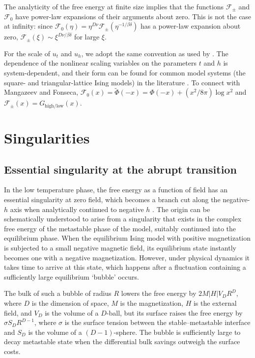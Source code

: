 \documentclass[
  aps,
  pre,
  preprint,
  longbibliography,
  floatfix
]{revtex4-2}
\begin{document}
The analyticity of the free energy at finite size implies that the functions
$\mathcal F_\pm$ and $\mathcal F_0$ have power-law expansions of their
arguments about zero. This is not the case at infinity: since $\mathcal
F_0(\eta)=\eta^{D\nu}\mathcal F_\pm(\eta^{-1/\beta\delta})$ has
a power-law expansion about zero, $\mathcal F_\pm(\xi)\sim
\xi^{D\nu/\beta\delta}$ for large $\xi$.


For the scale of $u_t$ and $u_h$, we adopt the same convention as used by
\cite{Fonseca_2003_Ising}. The dependence of the nonlinear scaling variables on
the parameters $t$ and $h$ is system-dependent, and their form can be found for
common model systems (the square- and triangular-lattice Ising models) in the
literature \cite{Mangazeev_2010_Scaling, Clement_2019_Respect}.
To connect with Mangazeev and Fonseca, $\mathcal F_0(x)=\tilde\Phi(-x)=\Phi(-x)+(x^2/8\pi) \log x^2$ and $\mathcal F_\pm(x)=G_{\mathrm{high}/\mathrm{low}}(x)$.


\section{Singularities}

\subsection{Essential singularity at the abrupt transition}

In the low temperature phase, the free energy as a function of field has an
essential singularity at zero field, which becomes a branch cut along the
negative-$h$ axis when analytically continued to negative $h$
\cite{Langer_1967_Theory}. The origin can be schematically understood to arise
from a singularity that exists in the complex free energy of the metastable
phase of the model, suitably continued into the equilibrium phase. When the
equilibrium Ising model with positive magnetization is subjected to a small
negative magnetic field, its equilibrium state instantly becomes one with a
negative magnetization. However, under physical dynamics it takes time to
arrive at this state, which happens after a fluctuation containing a
sufficiently large equilibrium `bubble' occurs.

The bulk of such a bubble of radius $R$ lowers the free energy by
$2M|H|V_DR^D$, where $D$ is the dimension of space, $M$ is the magnetization,
$H$ is the external field, and $V_D$ is the volume of a $D$-ball, but its
surface raises the free energy by $\sigma S_DR^{D-1}$, where $\sigma$ is the
surface tension between the stable--metastable interface and $S_D$ is the
volume of a $(D-1)$-sphere. The bubble is sufficiently large to decay
metastable state when the differential bulk savings outweigh the surface costs.
\end{document}
